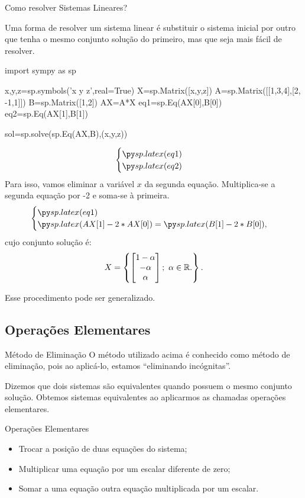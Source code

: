 \begin{frame}[label=sistemas,fragile=singleslide]{Como resolver Sistemas Lineares?}

Uma forma de resolver um sistema linear é {\color{blue}substituir o sistema inicial por outro que tenha o mesmo conjunto solução do primeiro}, mas que seja mais fácil de resolver.
\begin{pycode}
import sympy as sp

x,y,z=sp.symbols('x y z',real=True)
X=sp.Matrix([x,y,z])
A=sp.Matrix([[1,3,4],[2, -1,1]])
B=sp.Matrix([1,2])
AX=A*X
eq1=sp.Eq(AX[0],B[0])
eq2=sp.Eq(AX[1],B[1])

sol=sp.solve(sp.Eq(AX,B),(x,y,z))

\end{pycode}

\[\begin{cases}
\pyl{eq1}\\
\pyl{eq2}
\end{cases}\]
Para isso, vamos eliminar a variável \(x\) da segunda equação. Multiplica-se a segunda equação por -2 e soma-se à primeira.
\[\begin{cases}
\pyl{eq1}\\
\pyl{AX[1]-2*AX[0]}=\pyl{B[1]-2*B[0]},
\end{cases}\]
cujo  conjunto solução é: 
\[X=\left\{
\begin{bmatrix}
1-\alpha\\ -\alpha\\ \alpha
\end{bmatrix};\ \alpha \in \mathbb{R}.\right\}.\]

Esse procedimento pode ser generalizado.
\end{frame}


\subsection*{Operações Elementares}
\begin{frame}[label=sistemas]{Método de Eliminação}
O método utilizado acima é conhecido como {\color{blue} método de eliminação}, pois ao aplicá-lo, estamos ``eliminando incógnitas''.
\medskip

Dizemos que dois sistemas são {\color{blue}equivalentes} quando possuem  o mesmo conjunto solução. Obtemos sistemas equivalentes ao aplicarmos as chamadas {\color{blue} operações elementares}.

\begin{block}{Operações Elementares}
\begin{itemize}
\item Trocar a posição de duas equações do sistema;
\item Multiplicar uma equação por um escalar diferente de zero;
\item Somar a uma equação outra equação multiplicada por um escalar.
\end{itemize}
\end{block}


\end{frame}

